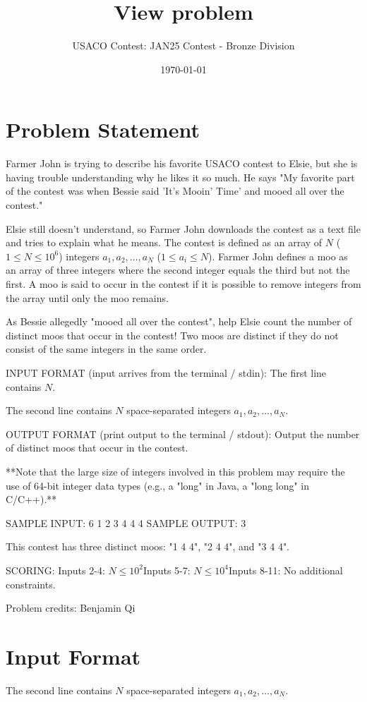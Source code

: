 \documentclass[12pt]{article}
\title{View problem}
\author{USACO Contest: JAN25 Contest - Bronze Division}
\date{\today}
\begin{document}
\maketitle

\section*{Problem Statement}


Farmer John is trying to describe his favorite USACO contest to Elsie, but she
is having trouble understanding why he likes it so much. He says "My favorite
part of the contest was when Bessie said 'It's Mooin' Time' and mooed all over
the contest."

Elsie still doesn't understand, so Farmer John downloads the contest as a text
file and tries to explain what he means. The contest is defined as an array of
$N$ ($1\le N\le 10^6$) integers $a_1, a_2, \dots, a_N$ ($1\le a_i\le N$). Farmer
John defines a moo as an array of three integers  where the second integer
equals the third but not the first. A moo is said to occur in the contest if it
is possible to remove integers from the array until only the moo remains.

As Bessie allegedly "mooed all over the contest", help Elsie count the number of
distinct moos that occur in the contest! Two moos are distinct if they do not consist of the same integers in the same
order.

INPUT FORMAT (input arrives from the terminal / stdin):
The first line contains $N$.

The second line contains $N$ space-separated integers $a_1,a_2,\dots,a_N$.

OUTPUT FORMAT (print output to the terminal / stdout):
Output the number of distinct moos that occur in the contest.

**Note that the large size of integers involved in this problem may require
the use of 64-bit integer data types (e.g., a "long" in Java, a "long long" in
C/C++).**

SAMPLE INPUT:
6
1 2 3 4 4 4
SAMPLE OUTPUT: 
3

This contest has three distinct moos: "1 4 4", "2 4 4", and "3 4 4".

SCORING:
Inputs 2-4: $N\le 10^2$Inputs 5-7: $N\le 10^4$Inputs 8-11: No additional constraints.


Problem credits: Benjamin Qi



\section*{Input Format}
The second line contains $N$ space-separated integers $a_1,a_2,\dots,a_N$.
\end{document}
